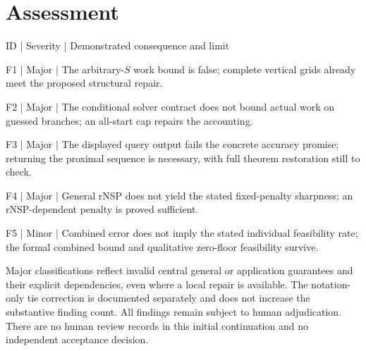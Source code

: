 \documentclass[10pt]{article}
\begin{document}
\section*{Assessment}
ID | Severity | Demonstrated consequence and limit\par
F1 | Major | The arbitrary-\(S\) work bound is false; complete vertical grids already meet the proposed structural repair.\par
F2 | Major | The conditional solver contract does not bound actual work on guessed branches; an all-start cap repairs the accounting.\par
F3 | Major | The displayed query output fails the concrete accuracy promise; returning the proximal sequence is necessary, with full theorem restoration still to check.\par
F4 | Major | General rNSP does not yield the stated fixed-penalty sharpness; an rNSP-dependent penalty is proved sufficient.\par
F5 | Minor | Combined error does not imply the stated individual feasibility rate; the formal combined bound and qualitative zero-floor feasibility survive.\par
Major classifications reflect invalid central general or application guarantees and their explicit dependencies, even where a local repair is available. The notation-only tie correction is documented separately and does not increase the substantive finding count. All findings remain subject to human adjudication. There are no human review records in this initial continuation and no independent acceptance decision.\par
\end{document}
